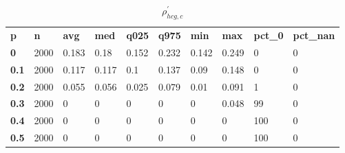 \begin{table}[h]
 \centering 
\footnotesize
\caption{$\rho_{hcg,c}^\prime $}
\label{tab:alphahcgc}
\begin{tabular}[h]{| l l l l l l l l l l|
    } \hline
\textbf{ p} & \textbf{ n} & \textbf{ avg} & \textbf{ med} & \textbf{ q025} & \textbf{ q975} & \textbf{ min} & \textbf{ max} & \textbf{ pct\_0} & \textbf{ pct\_nan}
           \\
  \textbf{  0} & 2000 & 0.183 &  0.18 & 0.152 & 0.232 & 0.142 & 0.249 &   0 & 0
           \\
  \textbf{0.1} & 2000 & 0.117 & 0.117 &   0.1 & 0.137 &  0.09 & 0.148 &   0 & 0
           \\
  \textbf{0.2} & 2000 & 0.055 & 0.056 & 0.025 & 0.079 &  0.01 & 0.091 &   1 & 0
           \\
  \textbf{0.3} & 2000 &     0 &     0 &     0 &     0 &     0 & 0.048 &  99 & 0
           \\
  \textbf{0.4} & 2000 &     0 &     0 &     0 &     0 &     0 &     0 & 100 & 0
           \\
  \textbf{0.5} & 2000 &     0 &     0 &     0 &     0 &     0 &     0 & 100 & 0
           \\
 \hline \end{tabular}
 \end{table}
